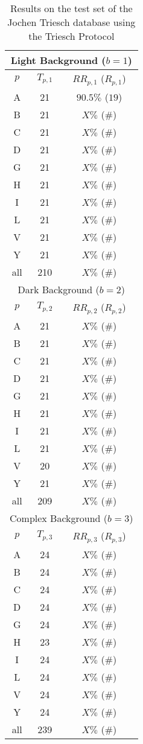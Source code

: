 \begin{table}
\caption{ \label{ResultsRecoJT} Results on the test set of the Jochen Triesch database using the Triesch Protocol}
\begin{center}
\begin{tabular}{ccc}
\hline
\multicolumn{3}{c}{Light Background ($b=1$)}\\
\hline
$p$ & $T_{p, 1}$ & $RR_{p, 1}$ ($R_{p, 1}$)\\
\hline
A  & 21 &  $90.5 \%$ ($19$)\\
B  & 21 &  $X \%$ ($\#$)\\
C  & 21 &  $X \%$ ($\#$)\\
D  & 21 &  $X \%$ ($\#$)\\
G  & 21 &  $X \%$ ($\#$)\\
H  & 21 &  $X \%$ ($\#$)\\
I  & 21 &  $X \%$ ($\#$)\\
L  & 21 &  $X \%$ ($\#$)\\
V  & 21 &  $X \%$ ($\#$)\\
Y  & 21 &  $X \%$ ($\#$)\\
all & 210 &  $X \%$ ($\#$)\\
\hline
\multicolumn{3}{c}{Dark Background ($b=2$)}\\
\hline
$p$ & $T_{p, 2}$ & $RR_{p, 2}$ ($R_{p, 2}$)\\
\hline
A  & 21 &  $X \%$ ($\#$)\\
B  & 21 &  $X \%$ ($\#$)\\
C  & 21 &  $X \%$ ($\#$)\\
D  & 21 &  $X \%$ ($\#$)\\
G  & 21 &  $X \%$ ($\#$)\\
H  & 21 &  $X \%$ ($\#$)\\
I  & 21 &  $X \%$ ($\#$)\\
L  & 21 &  $X \%$ ($\#$)\\
V  & 20 &  $X \%$ ($\#$)\\
Y  & 21 &  $X \%$ ($\#$)\\
all & 209 &  $X \%$ ($\#$)\\
\hline
\multicolumn{3}{c}{Complex Background ($b=3$)}\\
\hline
$p$ & $T_{p, 3}$ & $RR_{p, 3}$ ($R_{p, 3}$)\\
\hline
A  & 24 &  $X \%$ ($\#$)\\
B  & 24 &  $X \%$ ($\#$)\\
C  & 24 &  $X \%$ ($\#$)\\
D  & 24 &  $X \%$ ($\#$)\\
G  & 24 &  $X \%$ ($\#$)\\
H  & 23 &  $X \%$ ($\#$)\\
I  & 24 &  $X \%$ ($\#$)\\
L  & 24 &  $X \%$ ($\#$)\\
V  & 24 &  $X \%$ ($\#$)\\
Y  & 24 &  $X \%$ ($\#$)\\
all & 239 &  $X \%$ ($\#$)\\
\hline
\end{tabular}
\end{center}
\end{table}


